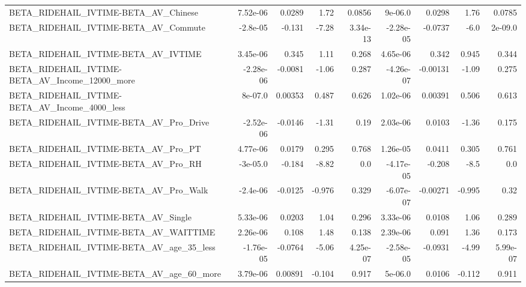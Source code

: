 \begin{tabular}{lrrrrrrrr}
BETA\_RIDEHAIL\_IVTIME-BETA\_AV\_Chinese               &    7.52e-06 &       0.0289 &      1.72 &   0.0856 &    9e-06.0 &      0.0298 &         1.76 &        0.0785 \\
BETA\_RIDEHAIL\_IVTIME-BETA\_AV\_Commute               &    -2.8e-05 &       -0.131 &     -7.28 & 3.34e-13 &  -2.28e-05 &     -0.0737 &         -6.0 &       2e-09.0 \\
BETA\_RIDEHAIL\_IVTIME-BETA\_AV\_IVTIME                &    3.45e-06 &        0.345 &      1.11 &    0.268 &   4.65e-06 &       0.342 &        0.945 &         0.344 \\
BETA\_RIDEHAIL\_IVTIME-BETA\_AV\_Income\_12000\_more     &   -2.28e-06 &      -0.0081 &     -1.06 &    0.287 &  -4.26e-07 &    -0.00131 &        -1.09 &         0.275 \\
BETA\_RIDEHAIL\_IVTIME-BETA\_AV\_Income\_4000\_less      &     8e-07.0 &      0.00353 &     0.487 &    0.626 &   1.02e-06 &     0.00391 &        0.506 &         0.613 \\
BETA\_RIDEHAIL\_IVTIME-BETA\_AV\_Pro\_Drive             &   -2.52e-06 &      -0.0146 &     -1.31 &     0.19 &   2.03e-06 &      0.0103 &        -1.36 &         0.175 \\
BETA\_RIDEHAIL\_IVTIME-BETA\_AV\_Pro\_PT                &    4.77e-06 &       0.0179 &     0.295 &    0.768 &   1.26e-05 &      0.0411 &        0.305 &         0.761 \\
BETA\_RIDEHAIL\_IVTIME-BETA\_AV\_Pro\_RH                &    -3e-05.0 &       -0.184 &     -8.82 &      0.0 &  -4.17e-05 &      -0.208 &         -8.5 &           0.0 \\
BETA\_RIDEHAIL\_IVTIME-BETA\_AV\_Pro\_Walk              &    -2.4e-06 &      -0.0125 &    -0.976 &    0.329 &  -6.07e-07 &    -0.00271 &       -0.995 &          0.32 \\
BETA\_RIDEHAIL\_IVTIME-BETA\_AV\_Single                &    5.33e-06 &       0.0203 &      1.04 &    0.296 &   3.33e-06 &      0.0108 &         1.06 &         0.289 \\
BETA\_RIDEHAIL\_IVTIME-BETA\_AV\_WAITTIME              &    2.26e-06 &        0.108 &      1.48 &    0.138 &   2.39e-06 &       0.091 &         1.36 &         0.173 \\
BETA\_RIDEHAIL\_IVTIME-BETA\_AV\_age\_35\_less           &   -1.76e-05 &      -0.0764 &     -5.06 & 4.25e-07 &  -2.58e-05 &     -0.0931 &        -4.99 &      5.99e-07 \\
BETA\_RIDEHAIL\_IVTIME-BETA\_AV\_age\_60\_more           &    3.79e-06 &      0.00891 &    -0.104 &    0.917 &    5e-06.0 &      0.0106 &       -0.112 &         0.911 \\

\end{tabular}
